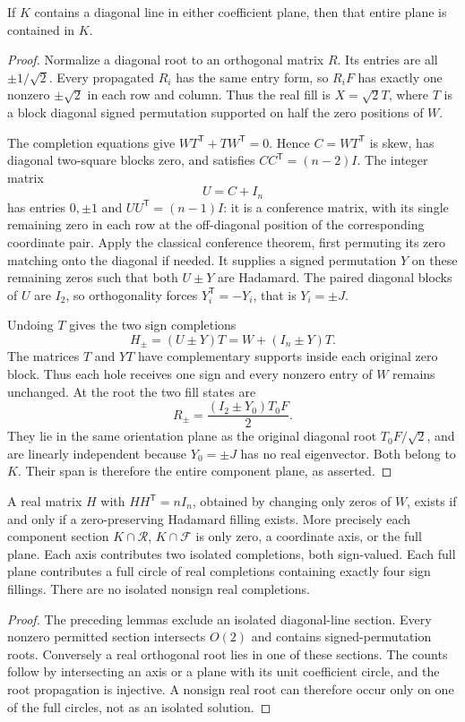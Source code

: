 \begin{lemma}
If $K$ contains a diagonal line in either coefficient plane, then
that entire plane is contained in $K$.
\end{lemma}
\begin{proof}
Normalize a diagonal root to an orthogonal matrix $R$. Its entries
are all $\pm1/\sqrt2$. Every propagated $R_i$ has the same entry
form, so $R_iF$ has exactly one nonzero $\pm\sqrt2$ in each row
and column. Thus the real fill is $X=\sqrt2T$, where $T$ is a
block diagonal signed permutation supported on half the zero
positions of $W$.

The completion equations give
$WT^{\mathsf T}+TW^{\mathsf T}=0$. Hence
$C=WT^{\mathsf T}$ is skew, has diagonal two-square blocks zero,
and satisfies $CC^{\mathsf T}=(n-2)I$. The integer matrix
\[
 U=C+I_n
\]
has entries $0,\pm1$ and $UU^{\mathsf T}=(n-1)I$: it is a
conference matrix, with its single remaining zero in each row at
the off-diagonal position of the corresponding coordinate pair.
Apply the classical conference theorem, first permuting its zero
matching onto the diagonal if needed. It supplies a signed
permutation $Y$ on these remaining zeros such that both $U\pm Y$
are Hadamard. The paired diagonal blocks of $U$ are $I_2$, so
orthogonality forces $Y_i^{\mathsf T}=-Y_i$, that is $Y_i=\pm J$.

Undoing $T$ gives the two sign completions
\[
 H_\pm=(U\pm Y)T=W+(I_n\pm Y)T.
\]
The matrices $T$ and $YT$ have complementary supports inside each
original zero block. Thus each hole receives one sign and every
nonzero entry of $W$ remains unchanged. At the root the two fill
states are
\[
 R_\pm=\frac{(I_2\pm Y_0)T_0F}{2}.
\]
They lie in the same orientation plane as the original diagonal
root $T_0F/\sqrt2$, and are linearly independent because $Y_0=\pm J$
has no real eigenvector. Both belong to $K$. Their span is therefore
the entire component plane, as asserted.
\end{proof}

\begin{theorem}
A real matrix $H$ with $HH^{\mathsf T}=nI_n$, obtained by changing
only zeros of $W$, exists if and only if a zero-preserving Hadamard
filling exists. More precisely each component section
$K\cap\mathcal R$, $K\cap\mathcal F$ is only zero, a coordinate
axis, or the full plane. Each axis contributes two isolated
completions, both sign-valued. Each full plane contributes a full
circle of real completions containing exactly four sign fillings.
There are no isolated nonsign real completions.
\end{theorem}
\begin{proof}
The preceding lemmas exclude an isolated diagonal-line section.
Every nonzero permitted section intersects $O(2)$ and contains
signed-permutation roots. Conversely a real orthogonal root lies
in one of these sections. The counts follow by intersecting an
axis or a plane with its unit coefficient circle, and the root
propagation is injective. A nonsign real root can therefore occur
only on one of the full circles, not as an isolated solution.
\end{proof}

